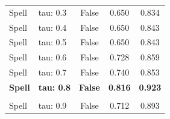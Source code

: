 \begin{small}
\begin{longtable}{llccc}
\midrule
Spell & tau: 0.3 & False & 0.650 & 0.834 \\
Spell & tau: 0.4 & False & 0.650 & 0.843 \\
Spell & tau: 0.5 & False & 0.650 & 0.843 \\
Spell & tau: 0.6 & False & 0.728 & 0.859 \\
Spell & tau: 0.7 & False & 0.740 & 0.853 \\
\textbf{Spell} & \textbf{tau: 0.8} & \textbf{False} & \textbf{0.816} & \textbf{0.923} \\\\
Spell & tau: 0.9 & False & 0.712 & 0.893 \\
\end{longtable}
\end{small}
